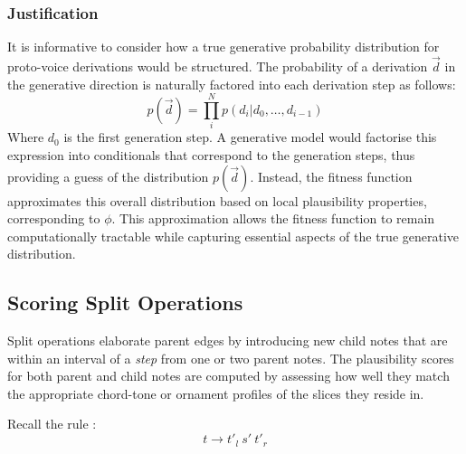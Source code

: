 \documentclass[12pt,a4paper,twoside,openany]{report} \usepackage[pdfborder={0 0 0}]{hyperref}    %
\theoremstyle{definition} \newtheorem{definition}{Definition}[section]
\begin{document}
    \subsubsection{Justification}

    It is informative to consider how a true generative probability distribution for proto-voice derivations would be
    structured. 
    The probability of a derivation $\vec{d}$ in the generative direction is naturally factored into each derivation step as
    follows:
    \begin{equation} 
      p(\vec{d}) = \prod_{i}^N p(d_i| d_0, \dots , d_{i-1}) 
    \end{equation}
    Where $d_0$ is the first generation step. A generative model would factorise this expression into
    conditionals that correspond to the generation steps, thus providing a guess of the distribution
    $p(\vec{d})$. Instead, the fitness function approximates this overall distribution based on local
    plausibility properties, corresponding to $\phi$. This approximation allows the fitness function to remain
    computationally tractable while capturing essential aspects of the true generative distribution.

    \subsection{Scoring Split Operations}

    Split operations elaborate parent edges by introducing new child notes that are within an interval of
    a \textit{step} from one or two parent notes. The plausibility scores for both parent and child notes are computed
    by assessing how well they match the appropriate chord-tone or ornament profiles of the slices they reside in.

    Recall the  rule : \[t \to t'_{l}~s'~t'_{r}\] \par

\end{document}
